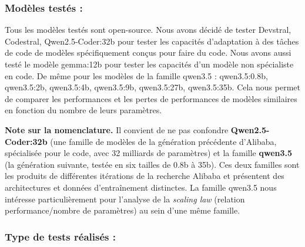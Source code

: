 \documentclass[11pt, a4paper]{article}
\begin{document}
\subsubsection{Modèles testés :} 
Tous les modèles testés sont open-source. Nous avons décidé de tester Devstral, Codestral, Qwen2.5-Coder:32b pour tester les capacités d'adaptation à des tâches de code de modèles spécifiquement conçus pour faire du code. Nous avons aussi testé le modèle gemma:12b pour tester les capacités d'un modèle non spécialiste en code.
    De même pour les modèles de la famille qwen3.5 : qwen3.5:0.8b, qwen3.5:2b, qwen3.5:4b, qwen3.5:9b, qwen3.5:27b, qwen3.5:35b. Cela nous permet de comparer les performances et les pertes de performances de modèles similaires en fonction du nombre de leurs paramètres.

\textbf{Note sur la nomenclature.} Il convient de ne pas confondre \textbf{Qwen2.5-Coder:32b} (une famille de modèles de la génération précédente d'Alibaba, spécialisée pour le code, avec 32 milliards de paramètres) et la famille \textbf{qwen3.5} (la génération suivante, testée en six tailles de 0.8b à 35b). Ces deux familles sont les produits de différentes itérations de la recherche Alibaba et présentent des architectures et données d'entraînement distinctes. La famille qwen3.5 nous intéresse particulièrement pour l'analyse de la \textit{scaling law} (relation performance/nombre de paramètres) au sein d'une même famille.

\subsubsection{Type de tests réalisés :}\label{sec:type de test}
\end{document}
